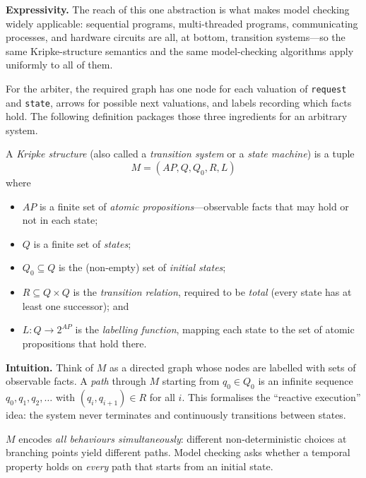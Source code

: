 \medskip\noindent
\textbf{Expressivity.}  The reach of this one abstraction is what makes
model checking widely applicable: sequential programs, multi-threaded
programs, communicating processes, and hardware circuits are all, at
bottom, transition systems---so the same Kripke-structure semantics and the
same model-checking algorithms apply uniformly to all of them.

For the arbiter, the required graph has one node for each valuation of
\texttt{request} and \texttt{state}, arrows for possible next valuations, and
labels recording which facts hold.  The following definition packages those
three ingredients for an arbitrary system.

\begin{definition}
\label{def:kripke}
A \emph{Kripke structure} (also called a \emph{transition system} or a
\emph{state machine}) is a tuple
\[
  M = (AP, Q, Q_0, R, L)
\]
where
\begin{itemize}
  \item $AP$ is a finite set of \emph{atomic propositions}---observable
        facts that may hold or not in each state;
  \item $Q$ is a finite set of \emph{states};
  \item $Q_0 \subseteq Q$ is the (non-empty) set of \emph{initial states};
  \item $R \subseteq Q \times Q$ is the \emph{transition relation},
        required to be \emph{total} (every state has at least one
        successor); and
  \item $L : Q \to 2^{AP}$ is the \emph{labelling function}, mapping each
        state to the set of atomic propositions that hold there.
\end{itemize}
\end{definition}

\medskip\noindent
\textbf{Intuition.}  Think of $M$ as a directed graph whose nodes are
labelled with sets of observable facts.  A \emph{path} through $M$ starting
from $q_0 \in Q_0$ is an infinite sequence
$q_0, q_1, q_2, \ldots$ with $(q_i, q_{i+1}) \in R$ for all $i$.  This
formalises the ``reactive execution'' idea: the system never terminates and
continuously transitions between states.

$M$ encodes \emph{all behaviours simultaneously}: different
non-deterministic choices at branching points yield different paths.  Model
checking asks whether a temporal property holds on \emph{every} path that
starts from an initial state.

